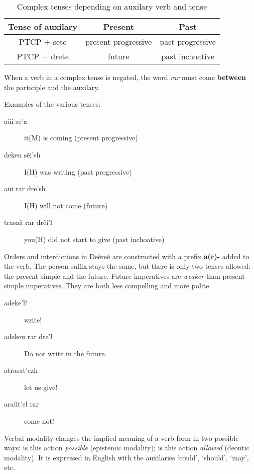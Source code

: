 \begin{table}[h]
\begin{center}
\begin{tabular}{|c|c|c|}\hline

\textbf{Tense of auxilary} & \textbf{Present} & \textbf{Past} \\\hline
PTCP + sete & present progressive & past progressive \\\hline
PTCP + drete & future & past inchoative \\\hline

\end{tabular}
\end{center}
\caption{Complex tenses depending on auxilary verb and tense}
\label{tab:conj-complex-tenses}
\end{table}

When a verb in a complex tense is negated, the word \emph{rar} must come \textbf{between} the participle and the auxilary.

Examples of the various tenses:
\begin{description}
\item[aüi se’a] it(M) is coming (present progressive)
\item[dekeu sẽi’sh] I(H) was writing (past progressive)
\item[aüi rar dre’sh] I(H) will not come (future)
\item[trasaã rar drẽi’l] you(H) did not start to give (past inchoative)
\end{description}

Orders and interdictions in Deẽreẽ are constructed with a prefix \textbf{a(r)-} added to the verb.
The person suffix stays the same, but there is only two tenses allowed: the present simple and the future.
Future imperatives are \emph{weaker} than present simple imperatives. They are both less compelling and more polite.

\begin{description}
\item[adeke’l!] write!
\item[adekeu rar dre’l] Do not write in the future.
\item[atrasat’ezh] let us give!
\item[araüt’el rar] come not!
\end{description}

Verbal modality changes the implied meaning of a verb form in two possible ways:
is this action \emph{possible} (epistemic modality); is this action \emph{allowed} (deontic modality).
It is expressed in English with the auxilaries ‘could’, ‘should’, ‘may’, etc.

